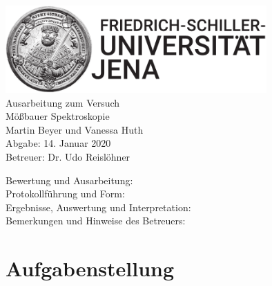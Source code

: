 \documentclass[a4paper,twoside,final]{article}
\begin{document}
\setlength{\marginparsep}{2em}
\renewcommand{\theequation}{\arabic{section}.\arabic{equation}}
\renewcommand{\thefigure}{\arabic{section}.\arabic{figure}}
\renewcommand{\thetable}{\arabic{section}.\arabic{table}}

\begin{center}
\thispagestyle{empty}
  \includegraphics[width=0.75\textwidth]{../UniJena_BildWortMarke_black.pdf}\\[4em]
  \Large
  Ausarbeitung zum Versuch\\[2em]
  \Huge
  Mößbauer Spektroskopie\\
  \vspace{2cm}
  \Large
  Martin Beyer und Vanessa Huth\\[2em]
  Abgabe: 14. Januar 2020\\[2em]
  Betreuer: Dr. Udo Reislöhner\\[5em]
  \begin{flushleft}
  	Bewertung und Ausarbeitung:\\[2em]
		Protokollführung und Form:\\[1em]
		Ergebnisse, Auswertung und Interpretation:\\[1em]
		Bemerkungen und Hinweise des Betreuers:
  \end{flushleft}
\end{center}
\clearpage

\pagestyle{fancy}
\renewcommand{\headrulewidth}{0pt}
\renewcommand{\footrulewidth}{0.5pt}
\renewcommand{\sectionmark}[1]{\markright{#1}}
\fancyhead[RE,LO]{\rightmark}
\fancyfoot[LE,RO]{\bfseries\thepage}
\renewcommand{\headrulewidth}{0.5pt}
\renewcommand{\footrulewidth}{0.5pt}

\setcounter{equation}{0}
\setcounter{figure}{0}

\tableofcontents
\newpage
\section{Aufgabenstellung} \label{sec:Aufgabenstellung}
\newpage
\end{document}
